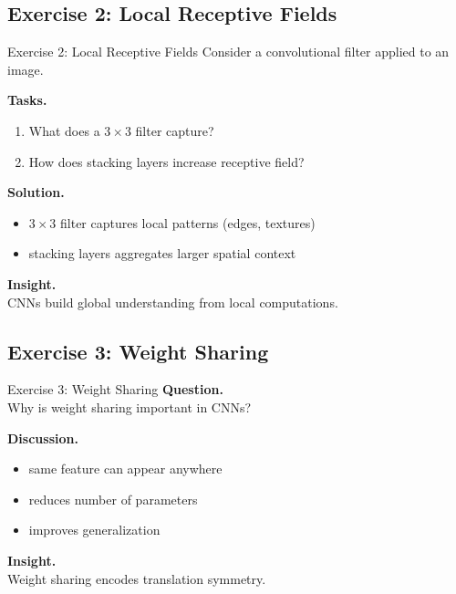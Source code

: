 \documentclass[aspectratio=169,11pt]{beamer}
\begin{document}
\subsection{Exercise 2: Local Receptive Fields}
\begin{frame}[t,allowframebreaks]{Exercise 2: Local Receptive Fields}
\small
Consider a convolutional filter applied to an image.

\textbf{Tasks.}\\ \begin{enumerate}
    \item What does a $3 \times 3$ filter capture?
    \item How does stacking layers increase receptive field?
\end{enumerate}

\textbf{Solution.}\\ \begin{itemize}
    \item $3 \times 3$ filter captures local patterns (edges, textures)
    \item stacking layers aggregates larger spatial context
\end{itemize}

\textbf{Insight.}\\ CNNs build global understanding from local computations.
\end{frame}

\subsection{Exercise 3: Weight Sharing}
\begin{frame}[t,allowframebreaks]{Exercise 3: Weight Sharing}
\small
\textbf{Question.}\\ Why is weight sharing important in CNNs?

\textbf{Discussion.}\\ \begin{itemize}
    \item same feature can appear anywhere
    \item reduces number of parameters
    \item improves generalization
\end{itemize}

\textbf{Insight.}\\ Weight sharing encodes translation symmetry.
\end{frame}
\end{document}
